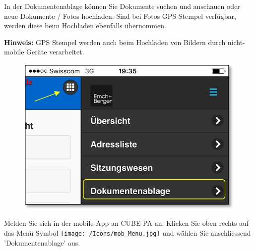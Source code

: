 In der Dokumentenablage können Sie Dokumente suchen und anschauen oder neue Dokumente / Fotos hochladen. Sind bei Fotos GPS Stempel verfügbar, werden diese beim Hochladen ebenfalls übernommen. 

\vspace{\baselineskip}

\textbf{Hinweis:} GPS Stempel werden auch beim Hochladen von Bildern durch nicht-mobile Geräte verarbeitet.

\pagebreak

\begin{figure}   %
  \vspace{-35pt}      %
  \begin{center}
    \includegraphics[width=1\linewidth]{../chapters/11_Dokumentenablage/pictures/11-mob01_Dokumentenablage_oeffnen.jpg}
  \end{center}
  \vspace{-20pt}
  \vspace{-10pt}
\end{figure}

Melden Sie sich in der mobile App an CUBE PA an. Klicken Sie oben rechts auf das Menü Symbol \texttt{[image: /Icons/mob\_Menu.jpg]} und wählen Sie anschliessend 'Dokumentenablage' aus.

\vspace{2cm}

